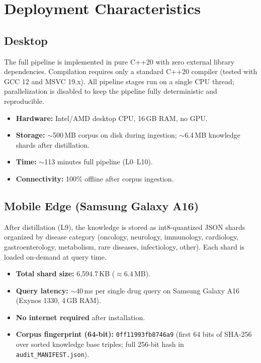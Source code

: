 \documentclass[11pt]{article}
\begin{document}
\section{Deployment Characteristics}
\label{sec:deployment}

\subsection{Desktop}
The full pipeline is implemented in pure C++20 with zero external
library dependencies. Compilation requires only a standard C++20
compiler (tested with GCC 12 and MSVC 19.x).
All pipeline stages run on a single CPU thread; parallelization
is disabled to keep the pipeline fully deterministic and reproducible.

\begin{itemize}[noitemsep]
  \item \textbf{Hardware:} Intel/AMD desktop CPU, 16\,GB RAM, no GPU.
  \item \textbf{Storage:} ${\sim}$500\,MB corpus on disk during ingestion;
    ${\sim}$6.4\,MB knowledge shards after distillation.
  \item \textbf{Time:} ${\sim}$113 minutes full pipeline (L0--L10).
  \item \textbf{Connectivity:} 100\% offline after corpus ingestion.
\end{itemize}

\subsection{Mobile Edge (Samsung Galaxy A16)}
After distillation (L9), the knowledge is stored as int8-quantized
JSON shards organized by disease category (oncology, neurology,
immunology, cardiology, gastroenterology, metabolism, rare diseases,
infectiology, other).
Each shard is loaded on-demand at query time.

\begin{itemize}[noitemsep]
  \item \textbf{Total shard size:} 6,594.7\,KB (${\approx}$6.4\,MB).
  \item \textbf{Query latency:} ${\sim}$40\,ms per single drug query
    on Samsung Galaxy A16 (Exynos 1330, 4\,GB RAM).
  \item \textbf{No internet required} after installation.
  \item \textbf{Corpus fingerprint (64-bit):} \texttt{0ff11993fb8746a9}
    (first 64 bits of SHA-256 over sorted knowledge base triples;
    full 256-bit hash in \texttt{audit\_MANIFEST.json}).
\end{itemize}
\end{document}
